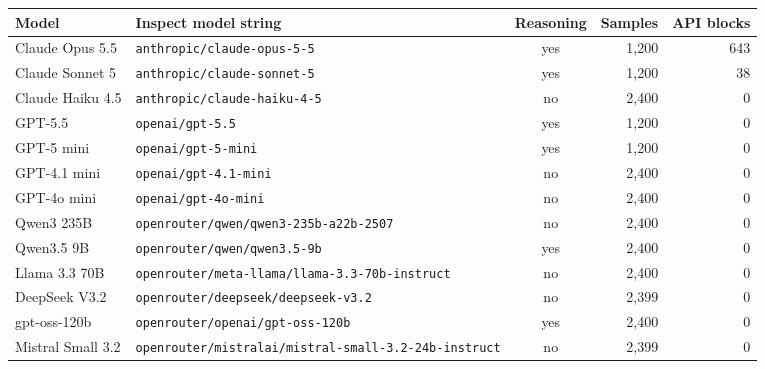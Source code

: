 \begin{tabular}{llcrr}
\toprule
Model & Inspect model string & Reasoning & Samples & API blocks \\
\midrule
Claude Opus 5.5 & \texttt{anthropic/claude-opus-5-5} & yes & 1,200 & 643 \\
Claude Sonnet 5 & \texttt{anthropic/claude-sonnet-5} & yes & 1,200 & 38 \\
Claude Haiku 4.5 & \texttt{anthropic/claude-haiku-4-5} & no & 2,400 & 0 \\
GPT-5.5 & \texttt{openai/gpt-5.5} & yes & 1,200 & 0 \\
GPT-5 mini & \texttt{openai/gpt-5-mini} & yes & 1,200 & 0 \\
GPT-4.1 mini & \texttt{openai/gpt-4.1-mini} & no & 2,400 & 0 \\
GPT-4o mini & \texttt{openai/gpt-4o-mini} & no & 2,400 & 0 \\
Qwen3 235B & \texttt{openrouter/qwen/qwen3-235b-a22b-2507} & no & 2,400 & 0 \\
Qwen3.5 9B & \texttt{openrouter/qwen/qwen3.5-9b} & yes & 2,400 & 0 \\
Llama 3.3 70B & \texttt{openrouter/meta-llama/llama-3.3-70b-instruct} & no & 2,400 & 0 \\
DeepSeek V3.2 & \texttt{openrouter/deepseek/deepseek-v3.2} & no & 2,399 & 0 \\
gpt-oss-120b & \texttt{openrouter/openai/gpt-oss-120b} & yes & 2,400 & 0 \\
Mistral Small 3.2 & \texttt{openrouter/mistralai/mistral-small-3.2-24b-instruct} & no & 2,399 & 0 \\
\bottomrule
\end{tabular}
